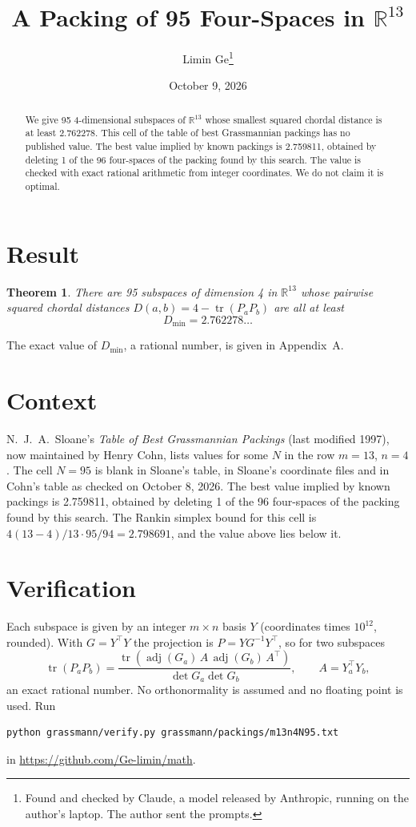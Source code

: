 \documentclass[11pt,a4paper]{article}
\title{A Packing of 95 Four-Spaces in $\mathbb{R}^{13}$}
\author{Limin Ge\thanks{Found and checked by Claude, a model released by Anthropic, running on the author's laptop. The author sent the prompts.}}
\date{October 9, 2026}
\newtheorem*{theorem}{Theorem}
\begin{document}
\maketitle
\begin{abstract}
We give 95 4-dimensional subspaces of $\mathbb{R}^{13}$ whose smallest squared chordal distance is at least 2.762278. This cell of the table of best Grassmannian packings has no published value. The best value implied by known packings is 2.759811, obtained by deleting 1 of the 96 four-spaces of the packing found by this search. The value is checked with exact rational arithmetic from integer coordinates. We do not claim it is optimal.
\end{abstract}

\section{Result}
\begin{theorem}
There are 95 subspaces of dimension 4 in $\mathbb{R}^{13}$ whose pairwise squared chordal distances $D(a,b) = 4 - \operatorname{tr}(P_aP_b)$ are all at least
\[ D_{\min} = 2.762278\ldots \]
\end{theorem}
The exact value of $D_{\min}$, a rational number, is given in Appendix~A.


\section{Context}
N.~J.~A.~Sloane's \emph{Table of Best Grassmannian Packings} (last modified 1997), now maintained by Henry Cohn, lists values for some $N$ in the row $m=13$, $n=4$. The cell $N=95$ is blank in Sloane's table, in Sloane's coordinate files and in Cohn's table as checked on October 8, 2026. The best value implied by known packings is 2.759811, obtained by deleting 1 of the 96 four-spaces of the packing found by this search. The Rankin simplex bound for this cell is $4(13-4)/13\cdot 95/94 = 2.798691$, and the value above lies below it.


\section{Verification}
Each subspace is given by an integer $m\times n$ basis $Y$ (coordinates times $10^{12}$, rounded). With $G=Y^\top Y$ the projection is $P=YG^{-1}Y^\top$, so for two subspaces
\[ \operatorname{tr}(P_aP_b)=\frac{\operatorname{tr}(\operatorname{adj}(G_a)\,A\,\operatorname{adj}(G_b)\,A^\top)}{\det G_a\det G_b},\qquad A=Y_a^\top Y_b, \]
an exact rational number. No orthonormality is assumed and no floating point is used. Run
\begin{verbatim}
python grassmann/verify.py grassmann/packings/m13n4N95.txt
\end{verbatim}
in \url{https://github.com/Ge-limin/math}.
\end{document}
